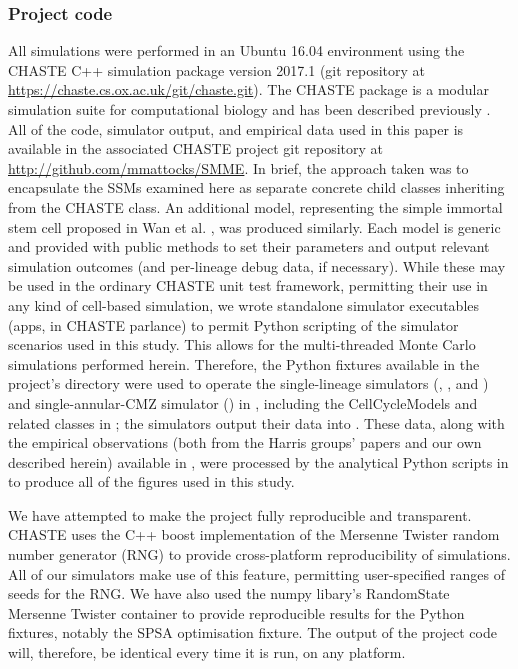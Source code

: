 \documentclass{ut-thesis}
\begin{document}
\begin{NoHyper}
\subsubsection{Project code}
All simulations were performed in an Ubuntu 16.04 environment using the CHASTE C++ simulation package version 2017.1 (git repository at \url{https://chaste.cs.ox.ac.uk/git/chaste.git}). The CHASTE package is a modular simulation suite for computational biology and has been described previously \cite{Mirams2013}. All of the code, simulator output, and empirical data used in this paper is available in the associated CHASTE project git repository at \url{http://github.com/mmattocks/SMME}. In brief, the approach taken was to encapsulate the SSMs examined here as separate concrete child classes inheriting from the CHASTE  class. An additional model, representing the simple immortal stem cell proposed in Wan et al. \cite{Wan2016}, was produced similarly. Each model is generic and provided with public methods to set their parameters and output relevant simulation outcomes (and per-lineage debug data, if necessary). While these may be used in the ordinary CHASTE unit test framework, permitting their use in any kind of cell-based simulation, we wrote standalone simulator executables (apps, in CHASTE parlance) to permit Python scripting of the simulator scenarios used in this study. This allows for the multi-threaded Monte Carlo simulations performed herein. Therefore, the Python fixtures available in the project's  directory were used to operate the single-lineage simulators (, , and ) and single-annular-CMZ simulator () in , including the CellCycleModels and related classes in ; the simulators output their data into . These data, along with the empirical observations (both from the Harris groups' papers and our own described herein) available in , were processed by the analytical Python scripts in  to produce all of the figures used in this study.

We have attempted to make the project fully reproducible and transparent. CHASTE uses the C++ boost implementation of the Mersenne Twister random number generator (RNG) to provide cross-platform reproducibility of simulations. All of our simulators make use of this feature, permitting user-specified ranges of seeds for the RNG. We have also used the numpy libary's RandomState Mersenne Twister container to provide reproducible results for the Python fixtures, notably the SPSA optimisation fixture. The output of the project code will, therefore, be identical every time it is run, on any platform.


\end{NoHyper}
\end{document}
